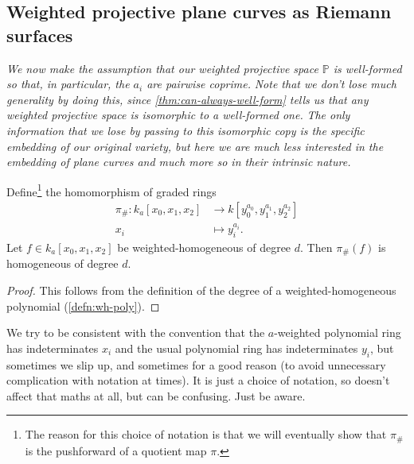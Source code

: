 \documentclass[10pt,notitlepage]{article}
\numberwithin{equation}{subsection}
\newcommand{\pee}{\mathbb{P}}
\newcommand{\kathree}{k_a[x_0,x_1,x_2]}
\begin{document}






    \subsection{Weighted projective plane curves as Riemann surfaces} %
    \label{sub:weighted_projective_plane_curves_as_riemann_surfaces}

        \emph{We now make the assumption that our weighted projective space $\pee$ is well-formed so that, in particular, the $a_i$ are pairwise coprime.}
        \emph{Note that we don't lose much generality by doing this, since \cref{thm:can-always-well-form} tells us that any weighted projective space is isomorphic to a well-formed one.}
        \emph{The only information that we lose by passing to this isomorphic copy is the specific embedding of our original variety, but here we are much less interested in the embedding of plane curves and much more so in their intrinsic nature.}

        \begin{lemma}\label{lem:pi-hash-maps-homo-to-homo}
            Define\footnote{%
                The reason for this choice of notation is that we will eventually show that $\pi_{\#}$ is the pushforward of a quotient map $\pi$.
            } the homomorphism of graded rings
            \begin{align*}
                \pi_{\#}\colon\kathree&\to k[y_0^{a_0},y_1^{a_1},y_2^{a_2}] \\
                x_i&\mapsto y_i^{a_i}.
            \end{align*}
            Let $f\in\kathree$ be weighted-homogeneous of degree $d$.
            Then $\pi_\#(f)$ is homogeneous of degree $d$.
        \end{lemma}

        \begin{proof}
            This follows from the definition of the degree of a weighted-homogeneous polynomial (\cref{defn:wh-poly}).
        \end{proof}

        \begin{note}
            We try to be consistent with the convention that the $a$-weighted polynomial ring has indeterminates $x_i$ and the usual polynomial ring has indeterminates $y_i$, but sometimes we slip up, and sometimes for a good reason (to avoid unnecessary complication with notation at times).
            It is just a choice of notation, so doesn't affect that maths at all, but can be confusing.
            Just be aware.
        \end{note}
\end{document}
